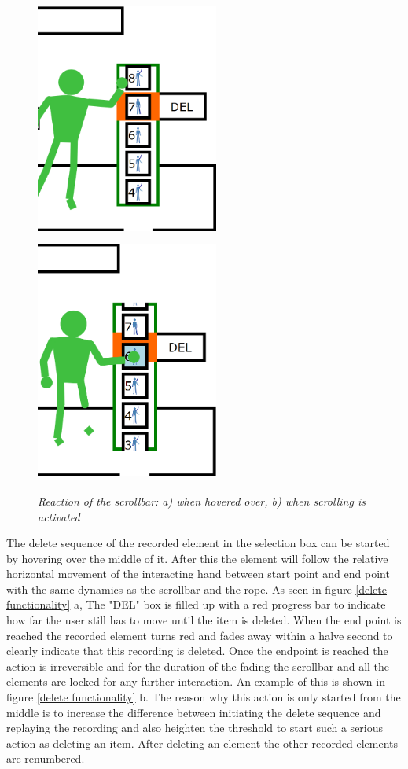 \begin{figure}[H]
	\begin{center}
		\includegraphics[width=6cm, height=8cm]{figures/9_hover_scrollbar.png}
		\includegraphics[width=6cm, height=8cm]{figures/10_scroll_scrollbar.png}
		\caption{\emph{Reaction of the scrollbar: a) when hovered over, b) when scrolling is activated}}
		\label{scroll functionality}
	\end{center}
\end{figure}

The delete sequence of the recorded element in the selection box can be started by hovering over the middle of it. After this the element will follow the relative horizontal movement of the interacting hand between start point and end point with the same dynamics as the scrollbar and the rope. As seen in figure \ref{delete functionality} a, The "DEL" box is filled up with a red progress bar to indicate how far the user still has to move until the item is deleted. When the end point is reached the recorded element turns red and fades away within a halve second to clearly indicate that this recording is deleted. Once the endpoint is reached the action is irreversible and for the duration of the fading the scrollbar and all the elements are locked for any further interaction. An example of this is shown in figure \ref{delete functionality} b. The reason why this action is only started from the middle is to increase the difference between initiating the delete sequence and replaying the recording and also heighten the threshold to start such a serious action as deleting an item. After deleting an element the other recorded elements are renumbered.\\

